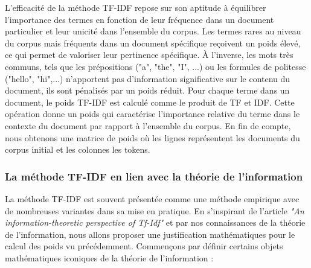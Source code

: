 \documentclass[12pt]{article}
\theoremstyle{definition}
\begin{document}
	L'efficacité de la méthode TF-IDF repose sur son aptitude à équilibrer l'importance des termes en fonction de leur fréquence dans un document particulier et leur unicité dans l'ensemble du corpus. Les termes rares au niveau du corpus mais fréquents dans un document spécifique reçoivent un poids élevé, ce qui permet de valoriser leur pertinence spécifique. À l'inverse, les mots très communs, tels que les prépositions ("a", "the", "I", ...) ou les formules de politesse ("hello", "hi",...)  n'apportent pas d'information significative sur le contenu du document, ils sont pénalisés par un poids réduit. Pour chaque terme dans un document, le poids TF-IDF est calculé comme le produit de TF et IDF. Cette opération donne un poids qui caractérise l'importance relative du terme dans le contexte du document par rapport à l'ensemble du corpus. En fin de compte, nous obtenons une matrice de poids où les lignes représentent les documents du corpus initial et les colonnes les tokens. 
	
	\subsubsection{La méthode TF-IDF en lien avec la théorie de l'information}
	
	La méthode TF-IDF est souvent présentée comme une méthode empirique avec de nombreuses variantes dans sa mise en pratique. En s'inspirant de l'article \textit{"An information-theoretic perspective of Tf-Idf"} \cite{TF_IDF_measures} et par nos connaissances de la théorie de l'information, nous allons proposer une justification mathématiques pour le calcul des poids vu précédemment. Commençons par définir certains objets mathématiques iconiques de la théorie de l'information :
	
\end{document}
